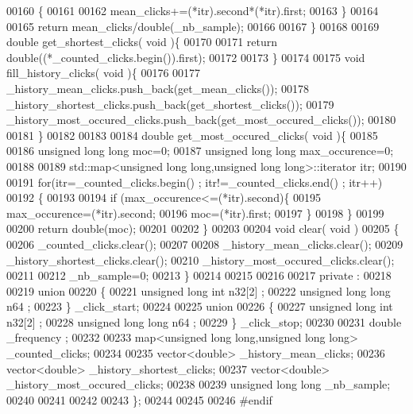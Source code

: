 \begin{DoxyCode}
00160       \{      
00161     
00162     mean\_clicks+=(*itr).second*(*itr).first;
00163       \}      
00164 
00165     \textcolor{keywordflow}{return} mean\_clicks/double(\_nb\_sample);
00166 
00167   \}
00168 
00169   \textcolor{keywordtype}{double} get\_shortest\_clicks( \textcolor{keywordtype}{void} )\{
00170     
00171     \textcolor{keywordflow}{return} double((*\_counted\_clicks.begin()).first);
00172 
00173   \}
00174 
00175   \textcolor{keywordtype}{void} fill\_history\_clicks( \textcolor{keywordtype}{void} )\{
00176 
00177     \_history\_mean\_clicks.push\_back(get\_mean\_clicks());
00178     \_history\_shortest\_clicks.push\_back(get\_shortest\_clicks());
00179     \_history\_most\_occured\_clicks.push\_back(get\_most\_occured\_clicks());
00180 
00181   \}
00182 
00183 
00184   \textcolor{keywordtype}{double} get\_most\_occured\_clicks( \textcolor{keywordtype}{void} )\{
00185 
00186     \textcolor{keywordtype}{unsigned} \textcolor{keywordtype}{long} \textcolor{keywordtype}{long} moc=0;
00187     \textcolor{keywordtype}{unsigned} \textcolor{keywordtype}{long} \textcolor{keywordtype}{long} max\_occurence=0;
00188 
00189     std::map<unsigned long long,unsigned long long>::iterator itr;
00190 
00191     \textcolor{keywordflow}{for}(itr=\_counted\_clicks.begin() ; itr!=\_counted\_clicks.end()  ; itr++)
00192       \{      
00193     
00194     \textcolor{keywordflow}{if} (max\_occurence<=(*itr).second)\{
00195       max\_occurence=(*itr).second;
00196       moc=(*itr).first;
00197     \}
00198       \}      
00199     
00200     \textcolor{keywordflow}{return} double(moc);    
00201 
00202   \}
00203   
00204   \textcolor{keywordtype}{void} clear( \textcolor{keywordtype}{void} )
00205   \{
00206     \_counted\_clicks.clear();
00207 
00208     \_history\_mean\_clicks.clear();
00209     \_history\_shortest\_clicks.clear();
00210     \_history\_most\_occured\_clicks.clear();
00211 
00212     \_nb\_sample=0;
00213   \}
00214 
00215 
00216     
00217 private :
00218   
00219   \textcolor{keyword}{union}
00220   \{
00221     \textcolor{keywordtype}{unsigned} \textcolor{keywordtype}{long} \textcolor{keywordtype}{int} n32[2] ;
00222     \textcolor{keywordtype}{unsigned} \textcolor{keywordtype}{long} \textcolor{keywordtype}{long} n64 ;
00223   \} \_click\_start;
00224 
00225   \textcolor{keyword}{union}
00226   \{
00227     \textcolor{keywordtype}{unsigned} \textcolor{keywordtype}{long} \textcolor{keywordtype}{int} n32[2] ;
00228     \textcolor{keywordtype}{unsigned} \textcolor{keywordtype}{long} \textcolor{keywordtype}{long} n64 ;
00229   \} \_click\_stop;
00230 
00231   \textcolor{keywordtype}{double} \_frequency ;
00232 
00233   map<unsigned long long,unsigned long long> \_counted\_clicks;
00234 
00235   vector<double> \_history\_mean\_clicks;
00236   vector<double> \_history\_shortest\_clicks;
00237   vector<double> \_history\_most\_occured\_clicks;
00238 
00239   \textcolor{keywordtype}{unsigned} \textcolor{keywordtype}{long} \textcolor{keywordtype}{long} \_nb\_sample;
00240 
00241   
00242 
00243 \};
00244 
00245 
00246 \textcolor{preprocessor}{#endif}
\end{DoxyCode}

